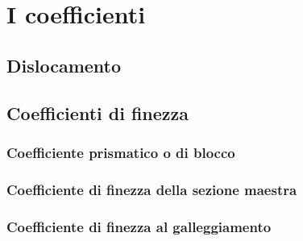 \chapter{I coefficienti}
\label{chap:coefficienti}
\section{Dislocamento}
\section{Coefficienti di finezza}
\subsection{Coefficiente prismatico o di blocco}
\subsection{Coefficiente di finezza della sezione maestra}
\subsection{Coefficiente di finezza al galleggiamento}